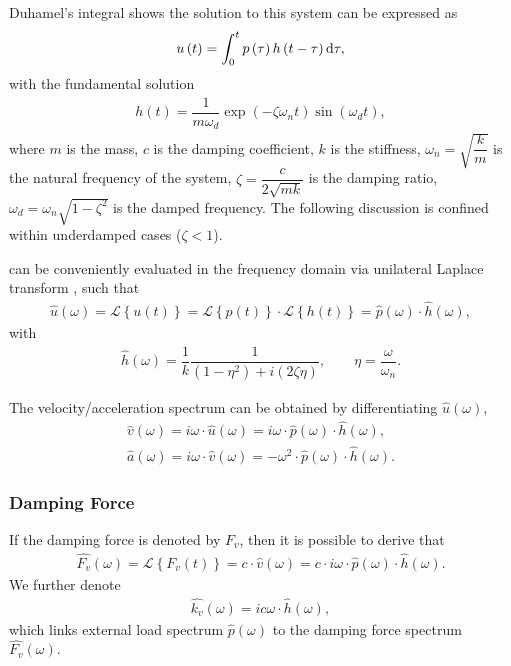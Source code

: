 Duhamel's integral shows the solution to this system can be expressed as
\begin{gather}\label{eq:duhamel}
u\left(t\right)=\int_{0}^{t}p\left(\tau\right)h\left(t-\tau\right)\mathrm{d}\tau,
\end{gather}
with the fundamental solution
\begin{gather}
h\left(t\right)=\dfrac{1}{m\omega_d}\exp\left(-\zeta\omega_nt\right)\sin\left(\omega_dt\right),
\end{gather}
where $m$ is the mass, $c$ is the damping coefficient, $k$ is the stiffness, $\omega_n=\sqrt{\dfrac{k}{m}}$ is the natural frequency of the system, $\zeta=\dfrac{c}{2\sqrt{mk}}$ is the damping ratio, $\omega_d=\omega_n\sqrt{1-\zeta^2}$ is the damped frequency. The following discussion is confined within underdamped cases ($\zeta<1$).

 can be conveniently evaluated in the frequency domain via unilateral Laplace transform \citep[see, e.g.,][]{Lee1990}, such that
\begin{gather}
\hat{u}\left(\omega\right)=\mathscr{L}\left\{u\left(t\right)\right\}=\mathscr{L}\left\{p\left(t\right)\right\}\cdot\mathscr{L}\left\{h\left(t\right)\right\}=\hat{p}\left(\omega\right)\cdot\hat{h}\left(\omega\right),
\end{gather}
with
\begin{gather}\label{eq:analytical_transfer}
\hat{h}\left(\omega\right)=\dfrac{1}{k}\dfrac{1}{\left(1-\eta^2\right)+i\left(2\zeta\eta\right)},\qquad\eta=\dfrac{\omega}{\omega_n}.
\end{gather}

The velocity/acceleration spectrum can be obtained by differentiating $\hat{u}\left(\omega\right)$,
\begin{gather}
\hat{v}\left(\omega\right)=i\omega\cdot{}\hat{u}\left(\omega\right)=i\omega\cdot{}\hat{p}\left(\omega\right)\cdot\hat{h}\left(\omega\right),\\
\hat{a}\left(\omega\right)=i\omega\cdot{}\hat{v}\left(\omega\right)=-\omega^2\cdot{}\hat{p}\left(\omega\right)\cdot\hat{h}\left(\omega\right).
\end{gather}
\subsubsection{Damping Force}
If the damping force is denoted by $F_v$, then it is possible to derive that
\begin{gather}
\hat{F_v}\left(\omega\right)=\mathscr{L}\left\{F_v\left(t\right)\right\}=c\cdot{}\hat{v}\left(\omega\right)=c\cdot{}i\omega\cdot{}\hat{p}\left(\omega\right)\cdot\hat{h}\left(\omega\right).
\end{gather}
We further denote
\begin{gather}
\hat{k_v}\left(\omega\right)=ic\omega\cdot\hat{h}\left(\omega\right),
\end{gather}
which links external load spectrum $\hat{p}\left(\omega\right)$ to the damping force spectrum $\hat{F_v}\left(\omega\right)$.

